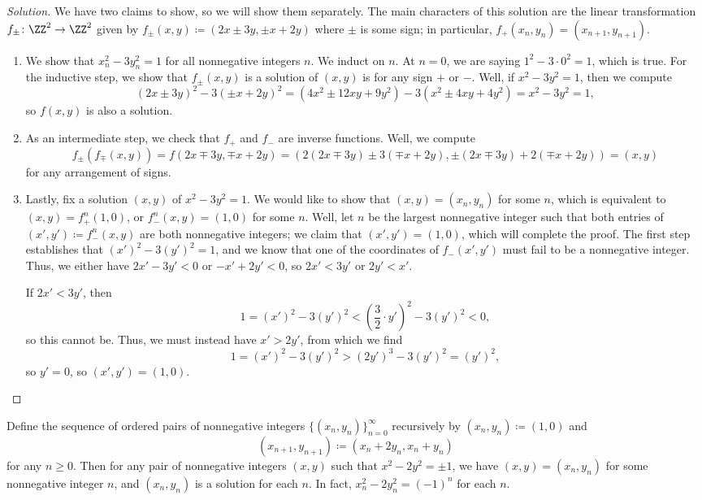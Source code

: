 \documentclass[../notes.tex]{subfiles}
\begin{document}
\begin{proof}[Solution]
	We have two claims to show, so we will show them separately. The main characters of this solution are the linear transformation $f_\pm\colon\ZZ^2\to\ZZ^2$ given by $f_\pm(x,y)\coloneqq(2x\pm3y,\pm x+2y)$ where $\pm$ is some sign; in particular, $f_+(x_n,y_n)=(x_{n+1},y_{n+1})$.
	\begin{enumerate}
		\item We show that $x_n^2-3y_n^2=1$ for all nonnegative integers $n$. We induct on $n$. At $n=0$, we are saying $1^2-3\cdot0^2=1$, which is true. For the inductive step, we show that $f_\pm(x,y)$ is a solution of $(x,y)$ is for any sign $+$ or $-$. Well, if $x^2-3y^2=1$, then we compute
		\[(2x\pm3y)^2-3(\pm x+2y)^2=\left(4x^2\pm12xy+9y^2\right)-3\left(x^2\pm4xy+4y^2\right)=x^2-3y^2=1,\]
		so $f(x,y)$ is also a solution.
		\item As an intermediate step, we check that $f_+$ and $f_-$ are inverse functions. Well, we compute
		\[f_{\pm}(f_{\mp}(x,y))=f(2x\mp3y,\mp x+2y)=(2(2x\mp3y)\pm3(\mp x+2y),\pm(2x\mp3y)+2(\mp x+2y))=(x,y)\]
		for any arrangement of signs.
		\item Lastly, fix a solution $(x,y)$ of $x^2-3y^2=1$. We would like to show that $(x,y)=(x_n,y_n)$ for some $n$, which is equivalent to $(x,y)=f_+^n(1,0)$, or $f_-^n(x,y)=(1,0)$ for some $n$. Well, let $n$ be the largest nonnegative integer such that both entries of $(x',y')\coloneqq f_-^n(x,y)$ are both nonnegative integers; we claim that $(x',y')=(1,0)$, which will complete the proof. The first step establishes that $(x')^2-3(y')^2=1$, and we know that one of the coordinates of $f_-(x',y')$ must fail to be a nonnegative integer. Thus, we either have $2x'-3y'<0$ or $-x'+2y'<0$, so $2x'<3y'$ or $2y'<x'$.

		If $2x'<3y'$, then
		\[1=(x')^2-3(y')^2<\left(\frac32\cdot y'\right)^2-3(y')^2<0,\]
		so this cannot be. Thus, we must instead have $x'>2y'$, from which we find
		\[1=(x')^2-3(y')^2>(2y')^3-3(y')^2=(y')^2,\]
		so $y'=0$, so $(x',y')=(1,0)$.
		\qedhere
	\end{enumerate}
\end{proof}
\begin{example} \label{ex:pell-2}
	Define the sequence of ordered pairs of nonnegative integers $\{(x_n,y_n)\}_{n=0}^\infty$ recursively by $(x_n,y_n)\coloneqq(1,0)$ and
	\[(x_{n+1},y_{n+1})\coloneqq(x_n+2y_n,x_n+y_n)\]
	for any $n\ge0$. Then for any pair of nonnegative integers $(x,y)$ such that $x^2-2y^2=\pm1$, we have $(x,y)=(x_n,y_n)$ for some nonnegative integer $n$, and $(x_n,y_n)$ is a solution for each $n$. In fact, $x_n^2-2y_n^2=(-1)^n$ for each $n$.
\end{example}
\end{document}
